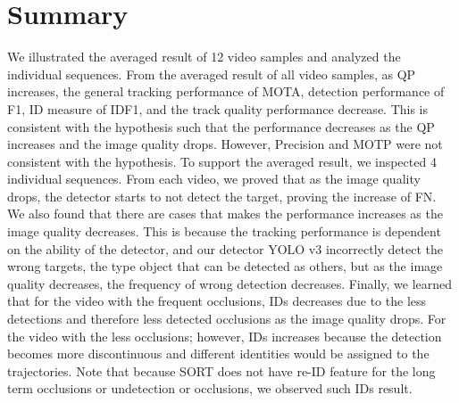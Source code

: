 \section{Summary}
\label{sec:results/summary}

We illustrated the averaged result of 12 video samples and analyzed the individual sequences. From the averaged result of all video samples, as QP increases, the general tracking performance of MOTA, detection performance of F1, ID measure of IDF1, and the track quality performance decrease. This is consistent with the hypothesis such that the performance decreases as the QP increases and the image quality drops. However, Precision and MOTP were not consistent with the hypothesis. To support the averaged result, we inspected 4 individual sequences. From each video, we proved that as the image quality drops, the detector starts to not detect the target, proving the increase of FN. We also found that there are cases that makes the performance increases as the image quality decreases. This is because the tracking performance is dependent on the ability of the detector, and our detector YOLO v3 incorrectly detect the wrong targets, the type object that can be detected as others, but as the image quality decreases, the frequency of wrong detection decreases. Finally, we learned that for the video with the frequent occlusions, IDs decreases due to the less detections and therefore less detected occlusions as the image quality drops. For the video with the less occlusions; however, IDs increases because the detection becomes more discontinuous and different identities would be assigned to the trajectories. Note that because SORT does not have re-ID feature for the long term occlusions or undetection or occlusions, we observed such IDs result.